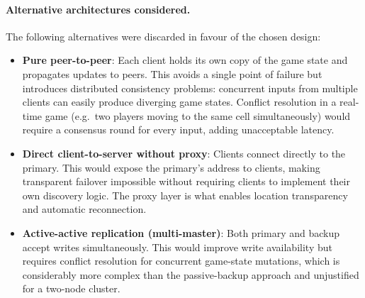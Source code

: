 \documentclass{scrartcl}
\begin{document}
\paragraph{Alternative architectures considered.}
The following alternatives were discarded in favour of the chosen design:

\begin{itemize}
    \item \textbf{Pure peer-to-peer}: Each client holds its own copy of the game state and propagates updates to peers.
    This avoids a single point of failure but introduces distributed consistency problems: concurrent inputs from multiple clients can easily produce diverging game states.
    Conflict resolution in a real-time game (e.g.\ two players moving to the same cell simultaneously) would require a consensus round for every input, adding unacceptable latency.

    \item \textbf{Direct client-to-server without proxy}: Clients connect directly to the primary.
    This would expose the primary's address to clients, making transparent failover impossible without requiring clients to implement their own discovery logic.
    The proxy layer is what enables location transparency and automatic reconnection.

    \item \textbf{Active-active replication (multi-master)}: Both primary and backup accept writes simultaneously.
    This would improve write availability but requires conflict resolution for concurrent game-state mutations, which is considerably more complex than the passive-backup approach and unjustified for a two-node cluster.
\end{itemize}
\end{document}
